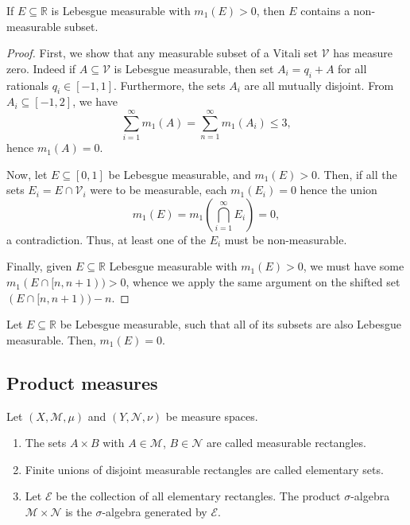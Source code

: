 \documentclass[11pt]{article}
\newcommand{\R}{\mathbb{R}}
\newcommand{\M}{\mathcal{M}}
\newcommand{\MN}{\mathcal{N}}
\theoremstyle{definition}
\theoremstyle{remark}
\numberwithin{equation}{section}
\begin{document}
    \begin{theorem}
        If $E \subseteq \R$ is Lebesgue measurable with $m_1(E) > 0$, then $E$
        contains a non-measurable subset.
    \end{theorem}
    \begin{proof}
        First, we show that any measurable subset of a Vitali set $\mathcal{V}$ has
        measure zero. Indeed if $A \subseteq \mathcal{V}$ is Lebesgue measurable,
        then set $A_i = q_i + A$ for all rationals $q_i \in [-1, 1]$. Furthermore,
        the sets $A_i$ are all mutually disjoint. From $A_i \subseteq [-1, 2]$, we
        have \[
            \sum_{i = 1}^\infty m_1(A) = \sum_{n = 1}^\infty m_1(A_i) \leq 3,
        \] hence $m_1(A) = 0$.

        Now, let $E \subseteq [0, 1]$ be Lebesgue measurable, and $m_1(E) > 0$. Then,
        if all the sets $E_i = E \cap \mathcal{V}_i$ were to be measurable, each
        $m_1(E_i) = 0$ hence the union \[
            m_1(E) = m_1\left(\bigcap_{i = 1}^\infty E_i\right) = 0,
        \] a contradiction. Thus, at least one of the $E_i$ must be non-measurable.

        Finally, given $E \subseteq \R$ Lebesgue measurable with $m_1(E) > 0$, we
        must have some $m_1(E \cap [n, n + 1)) > 0$, whence we apply the same
        argument on the shifted set $(E \cap [n, n + 1)) - n$.
    \end{proof}
    \begin{corollary}
        Let $E \subseteq \R$ be Lebesgue measurable, such that all of its subsets
        are also Lebesgue measurable. Then, $m_1(E) = 0$.
    \end{corollary}

    

    \subsection{Product measures}

    \begin{definition}
        Let $(X, \M, \mu)$ and $(Y, \MN, \nu)$ be measure spaces.
        \begin{enumerate}
            \itemsep0em
            \item The sets $A \times B$ with $A \in \M$, $B \in \MN$ are called
            measurable rectangles.
            \item Finite unions of disjoint measurable rectangles are called
            elementary sets.
            \item Let $\mathcal{E}$ be the collection of all elementary rectangles.
            The product $\sigma$-algebra $\M \times \MN$ is the $\sigma$-algebra
            generated by $\mathcal{E}$.
        \end{enumerate}
    \end{definition}
\end{document}
